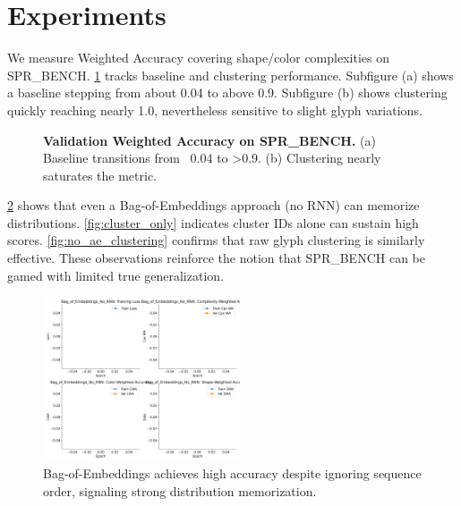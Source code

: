 \documentclass{article} %
\theoremstyle{plain}
\theoremstyle{definition}
\theoremstyle{remark}
\begin{document}
\section{Experiments}
We measure Weighted Accuracy covering shape/color complexities on SPR\_BENCH. \cref{fig:main_comparison} tracks baseline and clustering performance. Subfigure (a) shows a baseline stepping from about 0.04 to above 0.9. Subfigure (b) shows clustering quickly reaching nearly 1.0, nevertheless sensitive to slight glyph variations.

\begin{figure}[t!]
\centering
{}
\hfill
{}
\caption{\textbf{Validation Weighted Accuracy on SPR\_BENCH.} (a) Baseline transitions from ~0.04 to >0.9. (b) Clustering nearly saturates the metric.}
\label{fig:main_comparison}
\end{figure}

\cref{fig:bagofembeddings} shows that even a Bag-of-Embeddings approach (no RNN) can memorize distributions. \cref{fig:cluster_only} indicates cluster IDs alone can sustain high scores. \cref{fig:no_ae_clustering} confirms that raw glyph clustering is similarly effective. These observations reinforce the notion that SPR\_BENCH can be gamed with limited true generalization.

\begin{figure}[t!]
\centering
\includegraphics[width=0.52\textwidth]{Bag_of_Embeddings_No_RNN_Aggregated.png}
\caption{Bag-of-Embeddings achieves high accuracy despite ignoring sequence order, signaling strong distribution memorization.}
\label{fig:bagofembeddings}
\end{figure}
\end{document}
